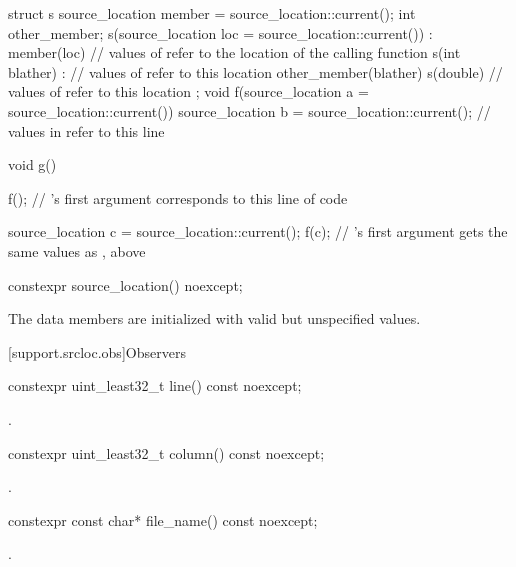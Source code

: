 \pnum
\begin{example}
\begin{codeblock}
struct s {
  source_location member = source_location::current();
  int other_member;
  s(source_location loc = source_location::current())
    : member(loc)               // values of  refer to the location of the calling function
  {}
  s(int blather) :              // values of  refer to this location
    other_member(blather)
  {}
  s(double)                     // values of  refer to this location
  {}
};
void f(source_location a = source_location::current()) {
  source_location b = source_location::current();       // values in  refer to this line
}

void g() {
  f();                          // 's first argument corresponds to this line of code

  source_location c = source_location::current();
  f(c);                         // 's first argument gets the same values as , above
}
\end{codeblock}
\end{example}

\begin{itemdecl}
constexpr source_location() noexcept;
\end{itemdecl}
\begin{itemdescr}

\pnum
\effects
The data members are initialized with valid but unspecified values.
\end{itemdescr}

[support.srcloc.obs]{Observers}

\begin{itemdecl}
constexpr uint_least32_t line() const noexcept;
\end{itemdecl}
\begin{itemdescr}
\pnum
\returns
{}.
\end{itemdescr}

\begin{itemdecl}
constexpr uint_least32_t column() const noexcept;
\end{itemdecl}
\begin{itemdescr}
\pnum
\returns
{}.
\end{itemdescr}

\begin{itemdecl}
constexpr const char* file_name() const noexcept;
\end{itemdecl}
\begin{itemdescr}
\pnum
\returns
{}.
\end{itemdescr}

